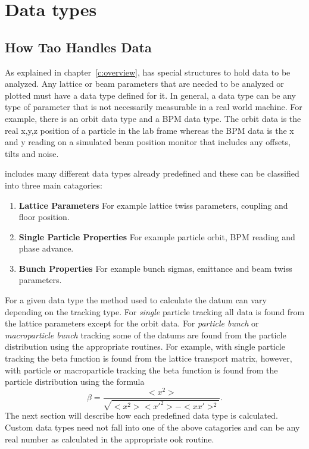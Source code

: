 \chapter{Data types}
\label{c:data_types}

\section{How Tao Handles Data}

As explained in chapter~\ref{c:overview}, \tao has special structures
to hold data to be analyzed. Any lattice or beam parameters that are
needed to be analyzed or plotted must have a data type defined for
it. In general, a data type can be any type of parameter that is not
necessarily measurable in a real world machine. For example, there is
an orbit data type and a BPM data type. The orbit data is the real
x,y,z position of a particle in the lab frame whereas the BPM data is
the x and y reading on a simulated beam position monitor that includes
any offsets, tilts and noise.

\tao includes many different data types already predefined and
these can be classified into three main catagories:
\begin{enumerate}
  \item \textbf{Lattice Parameters} \Newline
    For example lattice twiss parameters, coupling and floor position.
  \item \textbf{Single Particle Properties} \Newline
    For example particle orbit, BPM reading and phase advance.
  \item \textbf{Bunch Properties} \Newline
    For example bunch sigmas, emittance and beam twiss parameters.
\end{enumerate}
For a given data type the method used to calculate the datum can vary
depending on the tracking type. For {\it single} particle tracking all
data is found from the lattice parameters except for the orbit
data. For \textit{particle bunch} or \textit{macroparticle bunch}
tracking some of the datums are found from the particle distribution
using the appropriate \bmad routines. For example, with single
particle tracking the beta function is found from the lattice
transport matrix, however, with particle or macroparticle tracking the
beta function is found from the particle distribution using the
formula
\begin{equation}
  \beta = \frac{<x^{2}>}{\sqrt{<x^{2}> <x'^{2}> - <x x'>^{2}}}.
\end{equation}
The next section will describe how each predefined data type is
calculated.  Custom data types need not fall into one of the above
catagories and can be any real number as calculated in the appropriate
ook routine.

